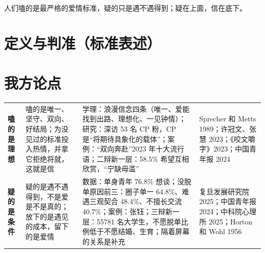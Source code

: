 \documentclass[quick,pro]{debate}
\begin{document}
\debatetitle
\begin{thesisbox}人们嗑的是最严格的爱情标准，疑的只是遇不遇得到；疑在上面，信在底下。\end{thesisbox}

\section{定义与判准（标准表述）}
\begin{fields}
\end{fields}

\section{我方论点}
\begin{tabularx}{\linewidth}{@{}L{4.6em}Y Y L{6.4em}@{}}\toprule
{}&&&\\\midrule
\textbf{嗑的是理想}&嗑的是唯一、坚守、双向、好结局；为没见过的标准投入热情，并拿它拒绝将就，这就是信&学理：浪漫信念四条（唯一、爱能找到出路、理想化、一见钟情）；研究：深访 53 名 CP 粉，CP 是“将期待具象化的载体”；案例：“双向奔赴”2023 年十大流行语；二辩新一层：58.5\% 希望互相欣赏，“宁缺毋滥”&Sprecher 和 Metts 1989；许冠文、张慧 2023；《咬文嚼字》2023；中国青年报 2024\\
\textbf{疑的是条件}&疑的是遇不遇得到，不是爱是不是真的；放下的是遇见的成本，留下的是爱情&数据：单身青年 76.8\% 想谈；没脱单原因前三：圈子单一 64.8\%、难遇三观契合 48.4\%、不擅长交流 40.7\%；案例：张钰；三辩新一层：55781 名大学生，不愿脱单比例低于不愿结婚、生育；隔着屏幕的关系是补充&复旦发展研究院 2025；中国青年报 2024；中科院心理所 2025；Horton 和 Wohl 1956\\
\bottomrule\end{tabularx}
\end{document}
